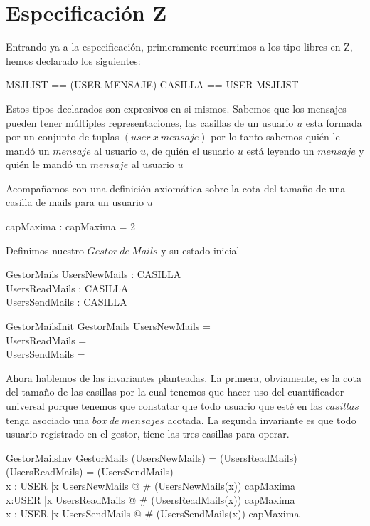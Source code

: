 \section{Especificación Z}
Entrando ya a la especificación, primeramente recurrimos a los tipo libres en Z, hemos declarado los siguientes:
\begin{zed}
\also
MSJLIST == \power(USER \cross MENSAJE)
\also
CASILLA == USER \pfun MSJLIST
\end{zed}
Estos tipos declarados son expresivos en si mismos. Sabemos que los mensajes pueden tener múltiples representaciones, las casillas de un usuario $u$ esta formada por un conjunto de tuplas $(user\ x\ mensaje)$ por lo tanto sabemos quién le mandó un $mensaje$ al usuario $u$, de quién el usuario $u$ está leyendo un $mensaje$ y quién le mandó un $mensaje$ al usuario $u$

Acompañamos con una definición axiomática sobre la cota del tamaño de una casilla de mails para un usuario $u$

\begin{axdef}
capMaxima : \nat 
\where
capMaxima = 2 
\end{axdef}

Definimos nuestro $Gestor\ de\ Mails$ y su estado inicial
\begin{schema}{GestorMails}
UsersNewMails : CASILLA \\
UsersReadMails : CASILLA \\
UsersSendMails : CASILLA 
\end{schema}

\begin{schema}{GestorMailsInit}
GestorMails
\where
UsersNewMails = \emptyset \\
UsersReadMails = \emptyset \\
UsersSendMails = \emptyset
\end{schema}

Ahora hablemos de las invariantes planteadas. La primera, obviamente, es la cota del tamaño de las casillas por la cual tenemos que hacer uso del cuantificador universal porque tenemos que constatar que todo usuario que esté en las $casillas$ tenga asociado una $box\ de\ mensajes$ acotada. La segunda invariante es que todo usuario registrado en el gestor, tiene las tres casillas para operar.

\begin{schema}{GestorMailsInv}
GestorMails
\where
\dom(UsersNewMails) = \dom(UsersReadMails)\\
\dom(UsersReadMails) = \dom(UsersSendMails) \\

\forall x : USER |x \in \dom UsersNewMails @ \# (UsersNewMails(x)) \leq capMaxima \\
\forall x:USER |x \in \dom UsersReadMails @ \# (UsersReadMails(x)) \leq capMaxima \\
\forall x : USER |x \in \dom UsersSendMails @ \# (UsersSendMails(x)) \leq capMaxima 
\end{schema}

